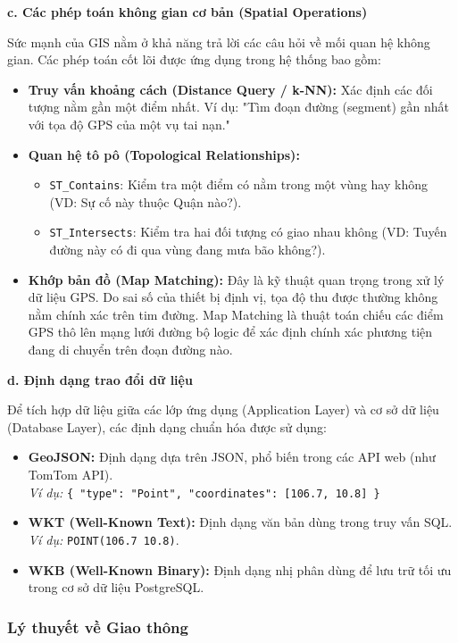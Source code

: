\textbf{c. Các phép toán không gian cơ bản (Spatial Operations)}

Sức mạnh của GIS nằm ở khả năng trả lời các câu hỏi về mối quan hệ không gian. Các phép toán cốt lõi được ứng dụng trong hệ thống bao gồm:
\begin{itemize}
    \item \textbf{Truy vấn khoảng cách (Distance Query / k-NN):} Xác định các đối tượng nằm gần một điểm nhất. Ví dụ: "Tìm đoạn đường (segment) gần nhất với tọa độ GPS của một vụ tai nạn."
    \item \textbf{Quan hệ tô pô (Topological Relationships):}
    \begin{itemize}
        \item \texttt{ST\_Contains}: Kiểm tra một điểm có nằm trong một vùng hay không (VD: Sự cố này thuộc Quận nào?).
        \item \texttt{ST\_Intersects}: Kiểm tra hai đối tượng có giao nhau không (VD: Tuyến đường này có đi qua vùng đang mưa bão không?).
    \end{itemize}
    \item \textbf{Khớp bản đồ (Map Matching):} Đây là kỹ thuật quan trọng trong xử lý dữ liệu GPS. Do sai số của thiết bị định vị, tọa độ thu được thường không nằm chính xác trên tim đường. Map Matching là thuật toán chiếu các điểm GPS thô lên mạng lưới đường bộ logic để xác định chính xác phương tiện đang di chuyển trên đoạn đường nào.
\end{itemize}

\textbf{d. Định dạng trao đổi dữ liệu}

Để tích hợp dữ liệu giữa các lớp ứng dụng (Application Layer) và cơ sở dữ liệu (Database Layer), các định dạng chuẩn hóa được sử dụng:
\begin{itemize}
    \item \textbf{GeoJSON:} Định dạng dựa trên JSON, phổ biến trong các API web (như TomTom API).
    \\ \textit{Ví dụ:} \texttt{\{ "type": "Point", "coordinates": [106.7, 10.8] \}}
    \item \textbf{WKT (Well-Known Text):} Định dạng văn bản dùng trong truy vấn SQL. \textit{Ví dụ:} \texttt{POINT(106.7 10.8)}.
    \item \textbf{WKB (Well-Known Binary):} Định dạng nhị phân dùng để lưu trữ tối ưu trong cơ sở dữ liệu PostgreSQL.
\end{itemize}

\subsubsection{Lý thuyết về Giao thông}

